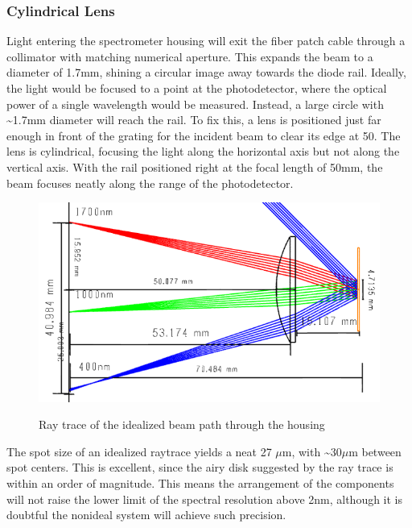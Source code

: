 \documentclass[journal]{IEEEtran}
\begin{document}
\subsubsection{Cylindrical Lens}
Light entering the spectrometer housing will exit the fiber patch cable through a collimator with matching numerical aperture. This expands the beam to a diameter of 1.7mm, shining a circular image away towards the diode rail. Ideally, the light would be focused to a point at the photodetector, where the optical power of a single wavelength would be measured. Instead, a large circle with \~{}1.7mm diameter will reach the rail. To fix this, a lens is positioned just far enough in front of the grating for the incident beam to clear its edge at 50\textdegree. The lens is cylindrical, focusing the light along the horizontal axis but not along the vertical axis. With the rail positioned right at the focal length of 50mm, the beam focuses neatly along the range of the photodetector.
\begin{figure}[H]
    \centering
    \includegraphics[width=\linewidth]{images/RayTrace.png}
    \label{fig:housing-ray-trace}
    \caption{Ray trace of the idealized beam path through the housing}
\end{figure}
The spot size of an idealized raytrace yields a neat 27 $\mu $m, with \~{}30$\mu $m between spot centers. This is excellent, since the airy disk suggested by the ray trace is within an order of magnitude. This means the arrangement of the components will not raise the lower limit of the spectral resolution above 2nm, although it is doubtful the nonideal system will achieve such precision. 
\end{document}
